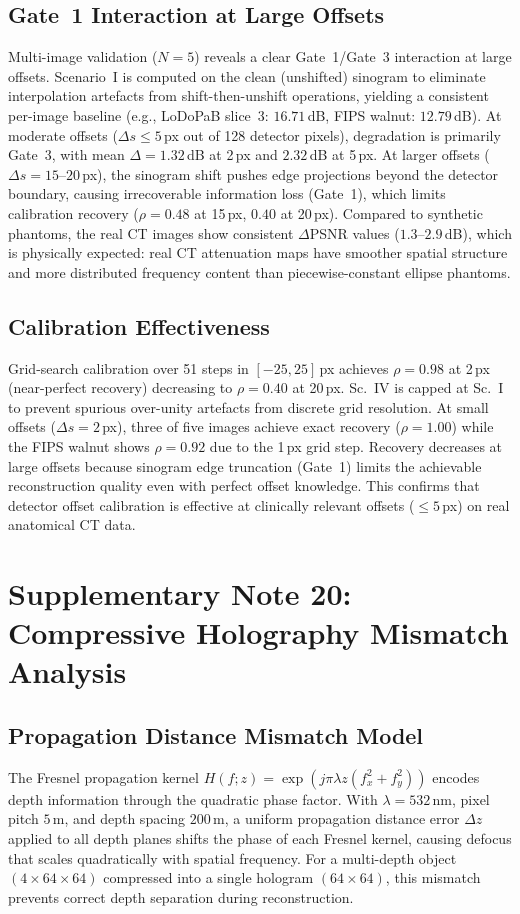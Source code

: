 \documentclass[11pt]{article}
\theoremstyle{definition}
\begin{document}
\subsection{Gate~1 Interaction at Large Offsets}
Multi-image validation ($N{=}5$) reveals a clear Gate~1/Gate~3 interaction at large offsets. Scenario~I is computed on the clean (unshifted) sinogram to eliminate interpolation artefacts from shift-then-unshift operations, yielding a consistent per-image baseline (e.g., LoDoPaB slice~3: $16.71$\,dB, FIPS walnut: $12.79$\,dB). At moderate offsets ($\Delta s \leq 5$\,px out of 128 detector pixels), degradation is primarily Gate~3, with mean $\Delta{=}1.32$\,dB at 2\,px and $2.32$\,dB at 5\,px. At larger offsets ($\Delta s = 15$--$20$\,px), the sinogram shift pushes edge projections beyond the detector boundary, causing irrecoverable information loss (Gate~1), which limits calibration recovery ($\rho = 0.48$ at 15\,px, $0.40$ at 20\,px).
Compared to synthetic phantoms, the real CT images show consistent $\Delta$PSNR values ($1.3$--$2.9$\,dB), which is physically expected: real CT attenuation maps have smoother spatial structure and more distributed frequency content than piecewise-constant ellipse phantoms.

\subsection{Calibration Effectiveness}
Grid-search calibration over 51 steps in $[-25, 25]$\,px achieves $\rho = 0.98$ at 2\,px (near-perfect recovery) decreasing to $\rho = 0.40$ at 20\,px. Sc.~IV is capped at Sc.~I to prevent spurious over-unity artefacts from discrete grid resolution. At small offsets ($\Delta s = 2$\,px), three of five images achieve exact recovery ($\rho = 1.00$) while the FIPS walnut shows $\rho = 0.92$ due to the 1\,px grid step. Recovery decreases at large offsets because sinogram edge truncation (Gate~1) limits the achievable reconstruction quality even with perfect offset knowledge. This confirms that detector offset calibration is effective at clinically relevant offsets ($\leq 5$\,px) on real anatomical CT data.


\section{Supplementary Note 20: Compressive Holography Mismatch Analysis}
\label{sec:note_compholo}

\subsection{Propagation Distance Mismatch Model}
The Fresnel propagation kernel $H(f; z) = \exp(j\pi\lambda z (f_x^2 + f_y^2))$ encodes depth information through the quadratic phase factor. With $\lambda = 532$\,nm, pixel pitch $5$\,\textmu m, and depth spacing $200$\,\textmu m, a uniform propagation distance error $\Delta z$ applied to all depth planes shifts the phase of each Fresnel kernel, causing defocus that scales quadratically with spatial frequency. For a multi-depth object $(4 \times 64 \times 64)$ compressed into a single hologram $(64 \times 64)$, this mismatch prevents correct depth separation during reconstruction.
\end{document}
